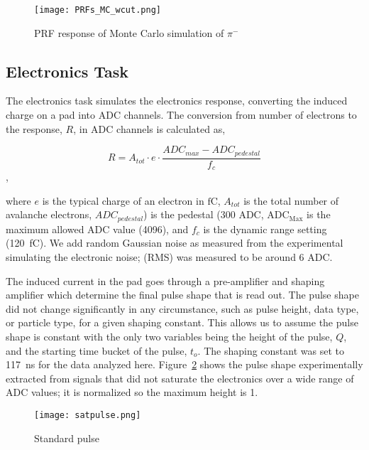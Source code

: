 \begin{figure}[!htb]
         \centering
         \texttt{[image: PRFs\_MC\_wcut.png]}
         \caption{PRF response of Monte Carlo simulation of $\pi^-$}
         \label{fig:prfpimMC}
\end{figure}


\subsection{Electronics Task}

The electronics task simulates the electronics response, converting  the induced charge on a pad into ADC channels. The conversion from number of electrons to the response, $R$, in ADC channels is calculated as, 

\begin{equation}
R = A_{tot} \cdot e \cdot\frac{ADC_{max} - ADC_{pedestal}}{f_c}
\label{eq:etoADC}
\end{equation},

where $e$ is the typical charge of an electron in $\si{\femto \coulomb}$, $A_{tot}$ is the total number of avalanche electrons, $ADC_{pedestal}$) is the pedestal (300 ADC, $\mathrm{ADC_{Max}}$ is the maximum allowed ADC value (4096), and $f_c$ is the dynamic range setting (\SI{120}{\femto\coulomb}). We add random Gaussian noise as measured from the experimental simulating the electronic noise; (RMS) was measured to be around 6 ADC. 

The induced current in the pad goes through a pre-amplifier and shaping amplifier which determine the final pulse shape that is read out. The pulse shape did not change significantly in any circumstance, such as pulse height, data type, or particle type, for a given shaping constant. This allows us to assume the pulse shape is constant with the only two variables being the height of the pulse, $Q$, and the starting time bucket of the pulse, $t_o$. The shaping constant was set to \SI{117}{\nano\second} for the data analyzed here. Figure~\ref{fig:pulseshape} shows the pulse shape experimentally extracted from signals that did not saturate the electronics over a wide range of ADC values; it is normalized so the maximum height is 1. 



\begin{figure}[!htb]
    \centering       
    \texttt{[image: satpulse.png]} 
    \caption{Standard pulse }
    \label{fig:pulseshape}
\end{figure}


